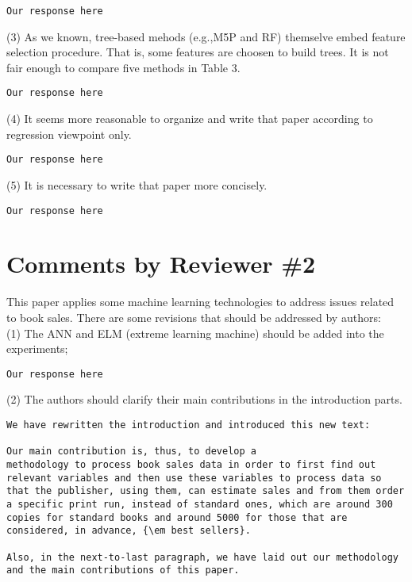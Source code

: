\documentclass[preprint]{elsarticle}
\begin{document}
\begin{verbatim}
Our response here
\end{verbatim}

\noindent (3) As we known, tree-based mehods (e.g.,M5P and RF) themselve embed feature selection procedure. That is, some features are choosen to build trees. It is not fair enough to compare five methods in Table 3. \\

\begin{verbatim}
Our response here
\end{verbatim}

\noindent (4) It seems more reasonable to organize and write that paper according to regression viewpoint only.\\

\begin{verbatim}
Our response here
\end{verbatim}

\noindent (5) It is necessary to write that paper more concisely.\\

\begin{verbatim}
Our response here
\end{verbatim}



\section{Comments by Reviewer \#2}

\noindent This paper applies some machine learning technologies to address issues related to book sales. There are some revisions that should be addressed by authors:\\


\noindent (1) The ANN and ELM (extreme learning machine) should be added into the experiments;\\

\begin{verbatim}
Our response here
\end{verbatim}


\noindent (2) The authors should clarify their main contributions in the introduction parts.\\

\begin{verbatim}
We have rewritten the introduction and introduced this new text:

Our main contribution is, thus, to develop a
methodology to process book sales data in order to first find out
relevant variables and then use these variables to process data so
that the publisher, using them, can estimate sales and from them order
a specific print run, instead of standard ones, which are around 300
copies for standard books and around 5000 for those that are
considered, in advance, {\em best sellers}.

Also, in the next-to-last paragraph, we have laid out our methodology 
and the main contributions of this paper.

\end{verbatim}
\end{document}
